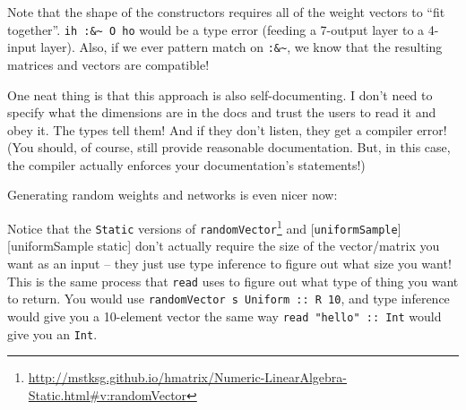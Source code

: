 \documentclass[]{article}
\newenvironment{Shaded}{}{}
\newcommand{\KeywordTok}[1]{\textcolor[rgb]{0.00,0.44,0.13}{\textbf{{#1}}}}
\newcommand{\DataTypeTok}[1]{\textcolor[rgb]{0.56,0.13,0.00}{{#1}}}
\newcommand{\DecValTok}[1]{\textcolor[rgb]{0.25,0.63,0.44}{{#1}}}
\newcommand{\CommentTok}[1]{\textcolor[rgb]{0.38,0.63,0.69}{\textit{{#1}}}}
\newcommand{\OtherTok}[1]{\textcolor[rgb]{0.00,0.44,0.13}{{#1}}}
\newcommand{\FunctionTok}[1]{\textcolor[rgb]{0.02,0.16,0.49}{{#1}}}
\newcommand{\NormalTok}[1]{{#1}}
\renewcommand{\href}[2]{#2\footnote{\url{#1}}}
\begin{document}
Note that the shape of the constructors requires all of the weight
vectors to ``fit together''. \texttt{ih\ :\&\textasciitilde{}\ O\ ho}
would be a type error (feeding a 7-output layer to a 4-input layer).
Also, if we ever pattern match on \texttt{:\&\textasciitilde{}}, we know
that the resulting matrices and vectors are compatible!

One neat thing is that this approach is also self-documenting. I don't
need to specify what the dimensions are in the docs and trust the users
to read it and obey it. The types tell them! And if they don't listen,
they get a compiler error! (You should, of course, still provide
reasonable documentation. But, in this case, the compiler actually
enforces your documentation's statements!)

Generating random weights and networks is even nicer now:

\begin{Shaded}
\end{Shaded}

Notice that the \texttt{Static} versions of
\href{http://mstksg.github.io/hmatrix/Numeric-LinearAlgebra-Static.html\#v:randomVector}{\texttt{randomVector}}
and {[}\texttt{uniformSample}{]}{[}uniformSample static{]} don't
actually require the size of the vector/matrix you want as an input --
they just use type inference to figure out what size you want! This is
the same process that \texttt{read} uses to figure out what type of
thing you want to return. You would use
\texttt{randomVector\ s\ Uniform\ ::\ R\ 10}, and type inference would
give you a 10-element vector the same way
\texttt{read\ "hello"\ ::\ Int} would give you an \texttt{Int}.
\end{document}
